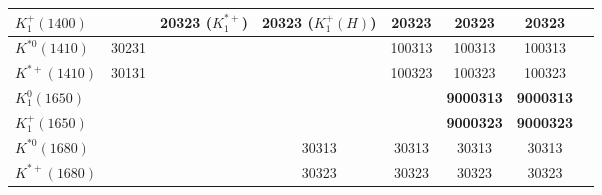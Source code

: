 \begin{tabular}{|l@{\tstrut}|c|c|c|c|c|c|c|}
$K_1^+(1400)$    &       & 20323 ($K_1^{*+}$) & 20323 ($K_1^+(H)$) & 20323 & 20323 & 20323 \\ \hline
$K^{*0}(1410)$   & 30231 &       &       &    100313 &       100313 & 100313 \\ \hline
$K^{*+}(1410)$   & 30131 &       &       &    100323 &       100323 & 100323 \\ \hline
$K_1^0(1650)$    &       &       &       &           & \bf{9000313} & \bf{9000313} \\ \hline
$K_1^+(1650)$    &       &       &       &           & \bf{9000323} & \bf{9000323} \\ \hline
$K^{*0}(1680)$   &       &       & 30313 &     30313 &        30313 & 30313 \\ \hline
$K^{*+}(1680)$   &       &       & 30323 &     30323 &        30323 & 30323 \\ \hline
\end{tabular}

